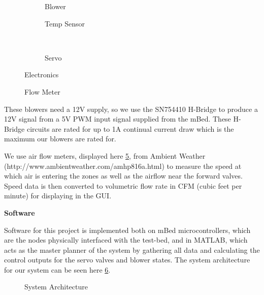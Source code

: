 \documentclass[a4paper,10pt,twocolumn]{article}
\begin{document}
\begin{figure}[t] 
	\centering
        \begin{subfigure}[l]{0.4\columnwidth}
		\centering
		\caption{Blower}
		\label{blower}
        \end{subfigure}
        \begin{subfigure}[r]{0.4\columnwidth}
		\centering
		\caption{Temp Sensor}
		\label{temp}
        \end{subfigure}
	\\
        \begin{subfigure}[r]{0.4\columnwidth}
		\centering
		\caption{Servo}
		\label{servo}
        \end{subfigure}
	\caption{Electronics}
        \label{electronics}
	\vspace{-7mm}
\end{figure}

\begin{figure}[b!]
\centering
{}
\caption{Flow Meter}
\label{flow}
\end{figure}

These blowers need a 12V supply, so we use the SN754410 H-Bridge to produce a 12V signal from a 5V PWM input signal supplied from the mBed.  These H-Bridge circuits are rated for up to 1A continual current draw which is the maximum our blowers are rated for.

We use air flow meters, displayed here \ref{flow}, from Ambient Weather (http://www.ambientweather.com/amhp816a.html) to measure the speed at which air is entering the zones as well as the airflow near the forward valves. Speed data is then converted to volumetric flow rate in CFM (cubic feet per minute) for displaying in the GUI.

\begin{center}
{\bf Software}
\end{center}

Software for this project is implemented both on mBed microcontrollers, which are the nodes physically interfaced with the test-bed, and in MATLAB, which acts as the master planner of the system by gathering all data and calculating the control outputs for the servo valves and blower states.  The system architecture for our system can be seen here \ref{sys_arch}.

\begin{figure}[b!]
\centering
{}
\caption{System Architecture}
\label{sys_arch}
\end{figure}
\end{document}
